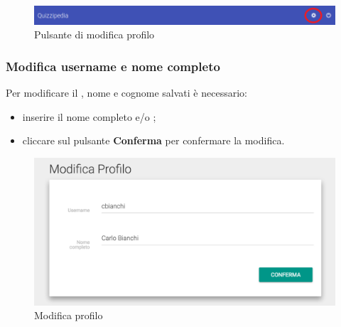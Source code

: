 \documentclass[12pt,a4paper]{article}
\begin{document}
	\begin{figure}[h]
		\centering
		\includegraphics[width=1.0\linewidth]{../img/screenshot/barraImpostaz.png}
		\caption{Pulsante di modifica profilo}
		\label{Pulsante di modifica profilo}
	\end{figure}
	
	\subsubsection{Modifica username e nome completo}
	Per modificare il , nome e cognome salvati è necessario:
	\begin{itemize}
		\item inserire il nome completo e/o ;
		\item cliccare sul pulsante \textbf{Conferma} per confermare la modifica.
	\end{itemize}
	\begin{figure}[h]	
		\centering
		\includegraphics[width=1.0\linewidth]{../img/screenshot/user1.png}
		\caption{Modifica profilo}
		\label{Modifica profilo}
	\end{figure}

	
\end{document}

